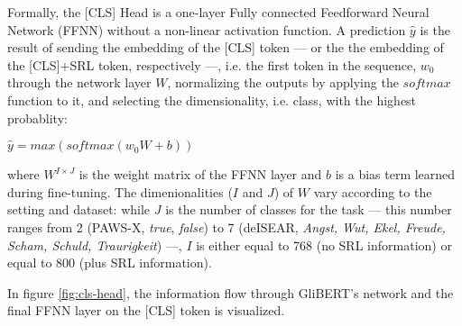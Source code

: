 
Formally, the [CLS] Head is a one-layer Fully connected Feedforward Neural Network (FFNN) without a
non-linear activation function. A prediction $\hat{y}$ is the result of sending the embedding
of the [CLS] token --- or the the embedding of the [CLS]+SRL token, respectively ---, i.e. the
first token in the sequence, $w_{0}$ through the network layer $W$, normalizing the outputs
by applying the $softmax$ function to it, and selecting the dimensionality, i.e. class, with the highest probablity:

$\hat{y} = max(softmax(w_{0}W+b))$

where $W^{I\times J}$ is the weight matrix of the FFNN layer and $b$ is a bias term learned during
fine-tuning. The dimenionalities ($I$ and $J$) of $W$ vary according to the setting and dataset:
while $J$ is the number of classes for the task --- this number ranges from 2 (PAWS-X, \emph{true},
\emph{false}) to 7 (deISEAR, \emph{Angst, Wut, Ekel, Freude, Scham, Schuld, Traurigkeit}) ---, $I$
is either equal to 768 (no SRL information) or equal to 800 (plus SRL information).

In figure \ref{fig:cls-head}, the information flow through GliBERT's network and the final FFNN
layer on the [CLS] token is visualized.


